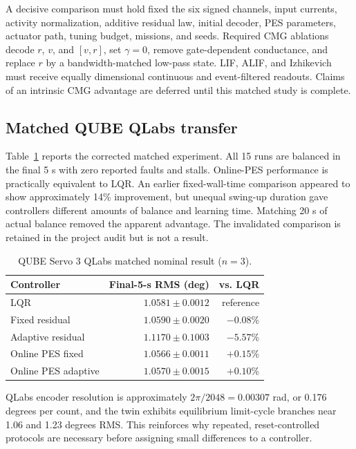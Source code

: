 \documentclass[10pt,twocolumn]{article}
\begin{document}
A decisive comparison must hold fixed the six signed channels, input currents,
activity normalization, additive residual law, initial decoder, PES parameters,
actuator path, tuning budget, missions, and seeds. Required CMG ablations decode
$r$, $v$, and $[v,r]$, set $\gamma=0$, remove gate-dependent conductance, and
replace $r$ by a bandwidth-matched low-pass state. LIF, ALIF, and Izhikevich must
receive equally dimensional continuous and event-filtered readouts. Claims of an
intrinsic CMG advantage are deferred until this matched study is complete.

\subsection{Matched QUBE QLabs transfer}

Table~\ref{tab:qube} reports the corrected matched experiment. All 15 runs are
balanced in the final 5 s with zero reported faults and stalls. Online-PES
performance is practically equivalent to LQR. An earlier fixed-wall-time
comparison appeared to show approximately 14\% improvement, but unequal
swing-up duration gave controllers different amounts of balance and learning
time. Matching 20 s of actual balance removed the apparent advantage. The
invalidated comparison is retained in the project audit but is not a result.

\begin{table}[t]
\centering
\caption{QUBE Servo 3 QLabs matched nominal result ($n=3$).}
\label{tab:qube}
\small
\begin{tabular}{lrr}
\toprule
Controller & Final-5-s RMS (deg) & vs. LQR \\
\midrule
LQR & $1.0581\pm0.0012$ & reference \\
Fixed residual & $1.0590\pm0.0020$ & $-0.08$\% \\
Adaptive residual & $1.1170\pm0.1003$ & $-5.57$\% \\
Online PES fixed & $1.0566\pm0.0011$ & $+0.15$\% \\
Online PES adaptive & $1.0570\pm0.0015$ & $+0.10$\% \\
\bottomrule
\end{tabular}
\end{table}

QLabs encoder resolution is approximately $2\pi/2048=0.00307$ rad, or
0.176 degrees per count, and the twin exhibits equilibrium limit-cycle branches
near 1.06 and 1.23 degrees RMS. This reinforces why repeated, reset-controlled
protocols are necessary before assigning small differences to a controller.
\end{document}
